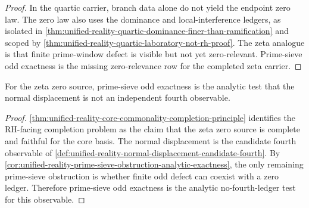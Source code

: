 \begin{proof}
In the quartic carrier, branch data alone do not yield the endpoint zero
law.  The zero law also uses the dominance and local-interference ledgers,
as isolated in
\autoref{thm:unified-reality-quartic-dominance-finer-than-ramification}
and scoped by
\autoref{thm:unified-reality-quartic-laboratory-not-rh-proof}.  The zeta
analogue is that finite prime-window defect is visible but not yet
zero-relevant.  Prime-sieve odd exactness is the missing zero-relevance
row for the completed zeta carrier.
\end{proof}

\begin{corollary}
\label{cor:unified-reality-prime-sieve-exactness-no-fourth-ledger-test}
For the zeta zero source, prime-sieve odd exactness is the analytic test
that the normal displacement is not an independent fourth observable.
\end{corollary}

\begin{proof}
\autoref{thm:unified-reality-core-commonality-completion-principle}
identifies the RH-facing completion problem as the claim that the zeta
zero source is complete and faithful for the core basis.  The normal
displacement is the candidate fourth observable of
\autoref{def:unified-reality-normal-displacement-candidate-fourth}.  By
\autoref{cor:unified-reality-prime-sieve-obstruction-analytic-exactness},
the only remaining prime-sieve obstruction is whether finite odd defect
can coexist with a zero ledger.  Therefore prime-sieve odd exactness is
the analytic no-fourth-ledger test for this observable.
\end{proof}

